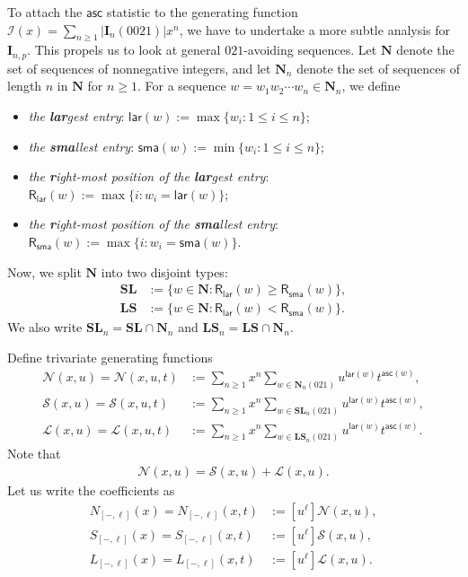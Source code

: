 \documentclass[reqno]{amsart}
\numberwithin{equation}{section}
\theoremstyle{plain}
\theoremstyle{definition}
\theoremstyle{named}
\newcommand{\bN}{\mathbf{N}}
\newcommand{\bI}{\mathbf{I}}
\newcommand{\bSL}{\mathbf{SL}}
\newcommand{\bLS}{\mathbf{LS}}
\newcommand{\asc}{\mathsf{asc}}
\newcommand{\lar}{\mathsf{lar}}
\newcommand{\sma}{\mathsf{sma}}
\newcommand{\RLAR}{\mathsf{R}_{\mathsf{lar}}}
\newcommand{\RSMA}{\mathsf{R}_{\mathsf{sma}}}
\newcommand{\cN}{\mathcal{N}}
\newcommand{\cSL}{\mathcal{S}}
\newcommand{\cLS}{\mathcal{L}}
\newcommand{\cI}{\mathcal{I}}
\newcommand{\coSL}{S}
\newcommand{\coLS}{L}
\newcommand{\coN}{N}
\begin{document}
To attach the $\asc$ statistic to the generating function $\cI(x)=\sum_{n\ge 1}|\bI_n(0021)|x^n$, we have to undertake a more subtle analysis for $\bI_{n,p}$. This propels us to look at general $021$-avoiding sequences. Let $\bN$ denote the set of sequences of nonnegative integers, and let $\bN_n$ denote the set of sequences of length $n$ in $\bN$ for $n\ge 1$. For a sequence $w=w_1w_2\cdots w_n\in\bN_n$, we define
\begin{itemize}[leftmargin=*,align=left]
	\renewcommand{\labelitemi}{$\triangleright$}
	\item \textit{the \textbf{lar}gest entry}: $\lar(w):=\max\{w_i:1\le i\le n\}$;
	
	\item \textit{the \textbf{sma}llest entry}: $\sma(w):=\min\{w_i:1\le i\le n\}$;
	
	\item \textit{the \textbf{r}ight-most position of the \textbf{lar}gest entry}: $\RLAR(w):=\max\{i:w_i=\lar(w)\}$;
	
	\item \textit{the \textbf{r}ight-most position of the \textbf{sma}llest entry}: $\RSMA(w):=\max\{i:w_i=\sma(w)\}$. 
\end{itemize}

Now, we split $\bN$ into two disjoint types:
\begin{align*}
	\bSL&:=\{w\in\bN:\RLAR(w)\ge \RSMA(w)\},\\
	\bLS&:=\{w\in\bN:\RLAR(w)< \RSMA(w)\}.
\end{align*}
We also write $\bSL_n=\bSL\cap\bN_n$ and $\bLS_n=\bLS\cap\bN_n$.

Define trivariate generating functions
\begin{align*}
	\cN(x,u)=\cN(x,u,t)&:=\sum_{n\ge 1}x^n\sum_{w\in\bN_n(021)}u^{\lar(w)}t^{\asc(w)},\\
	\cSL(x,u)=\cSL(x,u,t)&:=\sum_{n\ge 1}x^n\sum_{w\in\bSL_n(021)}u^{\lar(w)}t^{\asc(w)},\\
	\cLS(x,u)=\cLS(x,u,t)&:=\sum_{n\ge 1}x^n\sum_{w\in\bLS_n(021)}u^{\lar(w)}t^{\asc(w)}.
\end{align*}
Note that
\begin{align}\label{eq:N-SL-LS}
	\cN(x,u)=\cSL(x,u)+\cLS(x,u).
\end{align}
Let us write the coefficients as
\begin{align*}
	\coN_{[-,\ell]}(x)=\coN_{[-,\ell]}(x,t)&:=[u^\ell]\cN(x,u),\\
	\coSL_{[-,\ell]}(x)=\coSL_{[-,\ell]}(x,t)&:=[u^\ell]\cSL(x,u),\\
	\coLS_{[-,\ell]}(x)=\coLS_{[-,\ell]}(x,t)&:=[u^\ell]\cLS(x,u).
\end{align*}
\end{document}
